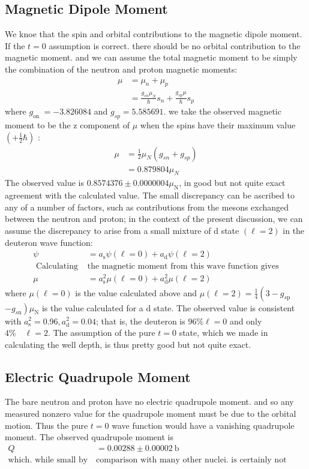  \subsection{Magnetic Dipole Moment}
 We knoe that the spin and orbital contributions to the magnetic dipole moment. If the $t=0$ assumption is correct. there should be no orbital contribution to the magnetic moment. and we can assume the total magnetic moment to be simply the combination of the neutron and proton magnetic moments:
 \begin{align*}
 \mu &=\mu_{n}+\mu_{p} \\
 &=\frac{g_{s n} \mu_{N}}{\hbar} s_{n}+\frac{g_{s p} \mu}{\hbar} s_{p}
 \end{align*}
 where $g_{\text {on }}=-3.826084$ and $g_{s p}=5.585691$. we take the observed magnetic moment to be the z component of $\mu$ when the spins have their maximum value $\left(+\frac{1}{2} \hbar\right)$ :
 \begin{align*}
 \mu &=\frac{1}{2} \mu_{N}\left(g_{s n}+g_{s p}\right) \\
 &=0.879804 \mu_{N}
 \end{align*}
 The observed value is $0.8574376 \pm 0.0000004 \mu_{\mathrm{N}}$, in good but not quite exact agreement with the calculated value. The small discrepancy can be ascribed to any of a number of factors, such as contributions from the mesons exchanged between the neutron and proton; in the context of the present discussion, we can assume the discrepancy to arise from a small mixture of $\mathrm{d}$ state $(\ell=2)$ in the deuteron wave function:
 \begin{align*}
  \psi&=a_{\mathrm{s}} \psi(\ell=0)+a_{\mathrm{d}} \psi(\ell=2)\\
\text{ Calculating }&\text{the magnetic moment from this wave function gives}\\
 \mu&=a_{\mathrm{s}}^{2} \mu(\ell=0)+a_{\mathrm{d}}^{2} \mu(\ell=2)
 \end{align*}
where $\mu(\ell=0)$ is the value calculated above and $\mu(\ell=2)=\frac{1}{4}\left(3-g_{s \mathrm{p}}\right.$ $\left.-g_{s \mathrm{n}}\right) \mu_{\mathrm{N}}$ is the value calculated for a d state. The observed value is consistent with $a_{\mathrm{s}}^{2}=0.96, a_{\mathrm{d}}^{2}=0.04$; that is, the deuteron is $96 \% \ell=0$ and only $4 \% \quad \ell=2$. The assumption of the pure $t=0$ state, which we made in calculating the well depth, is thus pretty good but not quite exact.
\subsection{Electric Quadrupole Moment}
The bare neutron and proton have no electric quadrupole moment. and so any measured nonzero value for the quadrupole moment must be due to the orbital motion. Thus the pure $t=0$ wave function would have a vanishing quadrupole moment. The observed quadrupole moment is
\begin{align*}
Q&=0.00288 \pm 0.00002 \mathrm{~b}\\
\text{which. while small by }&\text{comparison with many other nuclei. is certainly not zero.}
\end{align*}
